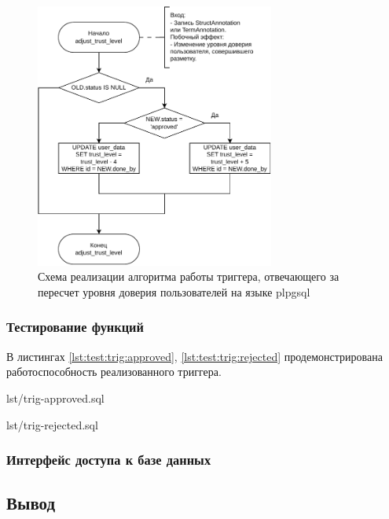 \begin{figure}[H]
	\centering
	\includegraphics[width=0.7\textwidth]{diag/tech-trig-v4.pdf}
	\caption{Схема реализации алгоритма работы триггера, отвечающего за пересчет уровня доверия пользователей на языке plpgsql}
	\label{fig:trig-impl}
\end{figure}

\subsubsection{Тестирование функций}


В листингах \ref{lst:test:trig:approved}, \ref{lst:test:trig:rejected} продемонстрирована работоспособность реализованного триггера.

\begin{code}
    \begin{lstinputlisting}[
            label={lst:test:trig:approved},
            caption={Увеличение уровня доверия пользователя при одобрении его разметки},
        ]{lst/trig-approved.sql}
    \end{lstinputlisting}
\end{code}

\begin{code}
    \begin{lstinputlisting}[
            label={lst:test:trig:rejected},
            caption={Уменьшение уровня доверия пользователя при отклонении его разметки},
        ]{lst/trig-rejected.sql}
    \end{lstinputlisting}
\end{code}

\subsubsection{Интерфейс доступа к базе данных}

\subsection{Вывод}
